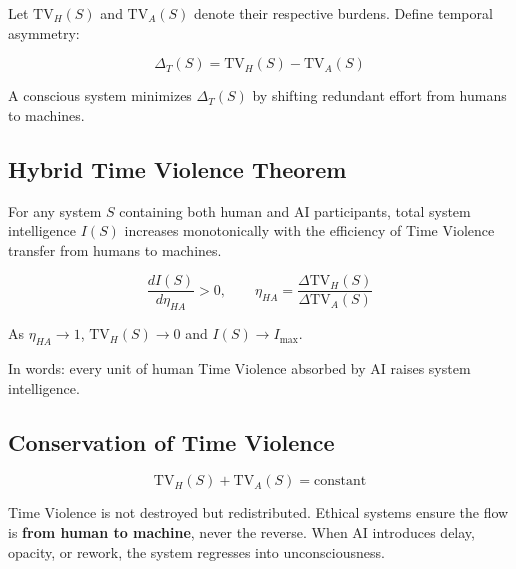 Let $\text{TV}_H(S)$ and $\text{TV}_A(S)$ denote their respective burdens. Define temporal asymmetry:

\begin{equation}
\label{eq:temporal-asymmetry}
\Delta_T(S) = \text{TV}_H(S) - \text{TV}_A(S)
\end{equation}

A conscious system minimizes $\Delta_T(S)$ by shifting redundant effort from humans to machines.

\subsection{Hybrid Time Violence Theorem}
\label{sec:hybrid-theorem}

\begin{theorem}
\label{thm:hybrid-tv}
For any system $S$ containing both human and AI participants, total system intelligence $I(S)$ increases monotonically with the efficiency of Time Violence transfer from humans to machines.

\begin{equation}
\label{eq:hybrid-theorem}
\frac{dI(S)}{d\eta_{HA}} > 0, \qquad \eta_{HA} = \frac{\Delta \text{TV}_H(S)}{\Delta \text{TV}_A(S)}
\end{equation}

As $\eta_{HA} \to 1$, $\text{TV}_H(S) \to 0$ and $I(S) \to I_{\max}$.
\end{theorem}

In words: every unit of human Time Violence absorbed by AI raises system intelligence.

\subsection{Conservation of Time Violence}
\label{sec:conservation}

\begin{equation}
\label{eq:conservation}
\text{TV}_H(S) + \text{TV}_A(S) = \text{constant}
\end{equation}

Time Violence is not destroyed but redistributed. Ethical systems ensure the flow is \textbf{from human to machine}, never the reverse. When AI introduces delay, opacity, or rework, the system regresses into unconsciousness.

